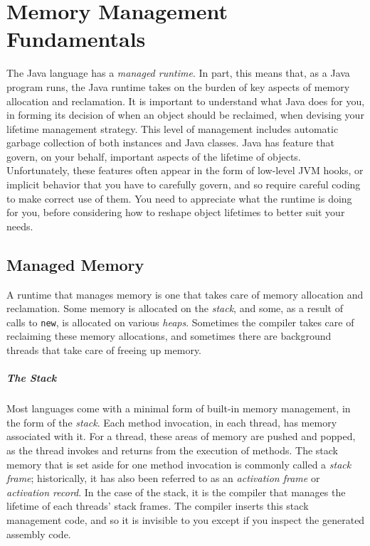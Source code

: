
\chapter{Memory Management Fundamentals}

The Java language has a \emph{managed runtime}. In part, this means that, as a
Java program runs, the Java runtime takes on the burden of key aspects of memory
allocation and reclamation. It is important to understand what Java does for
you, in forming its decision of when an object should be reclaimed, when
devising your lifetime management strategy. This level of management includes
automatic garbage collection of both instances and Java classes. Java has
feature that govern, on your behalf, important aspects of the lifetime of
objects. Unfortunately, these features often appear in the form of low-level JVM
hooks, or implicit behavior that you have to carefully govern, and so require
careful coding to make correct use of them. You need to appreciate what the
runtime is doing for you, before considering how to reshape object lifetimes to
better suit your needs.

\section{Managed Memory}

A runtime that manages memory is one that takes care of memory allocation and
reclamation. Some memory is allocated on the \emph{stack}, and some, as a result
of calls to {\tt new}, is allocated on various \emph{heaps}. Sometimes the
compiler takes care of reclaiming these memory allocations, and sometimes there
are background threads that take care of freeing up memory.

\paragraph{The Stack}
Most languages come with a minimal form of built-in memory management, in the
form of the \emph{stack}. Each method invocation, in each thread, has memory
associated with it. For a thread, these areas of memory are pushed and popped,
as the thread invokes and returns from the execution of methods. The stack
memory that is set aside for one method invocation is commonly called a
\emph{stack frame}; historically, it has also been referred
to as an \emph{activation frame} or \emph{activation record}. In the case of the stack, it is the compiler
that manages the lifetime of each threads' stack frames. The compiler inserts
this stack management code, and so it is invisible to you except if you inspect
the generated assembly code.

